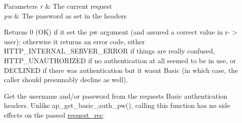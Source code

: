 \begin{DoxyParams}{Parameters}
{\em r} & The current request \\
\hline
{\em pw} & The password as set in the headers \\
\hline
\end{DoxyParams}
\begin{DoxyReturn}{Returns}
0 (OK) if it set the \textquotesingle{}pw\textquotesingle{} argument (and assured a correct value in r-\/$>$user); otherwise it returns an error code, either H\+T\+T\+P\+\_\+\+I\+N\+T\+E\+R\+N\+A\+L\+\_\+\+S\+E\+R\+V\+E\+R\+\_\+\+E\+R\+R\+OR if things are really confused, H\+T\+T\+P\+\_\+\+U\+N\+A\+U\+T\+H\+O\+R\+I\+Z\+ED if no authentication at all seemed to be in use, or D\+E\+C\+L\+I\+N\+ED if there was authentication but it wasn\textquotesingle{}t Basic (in which case, the caller should presumably decline as well).
\end{DoxyReturn}
Get the username and/or password from the request\textquotesingle{}s Basic authentication headers. Unlike ap\+\_\+get\+\_\+basic\+\_\+auth\+\_\+pw(), calling this function has no side effects on the passed \hyperlink{structrequest__rec}{request\+\_\+rec}.


